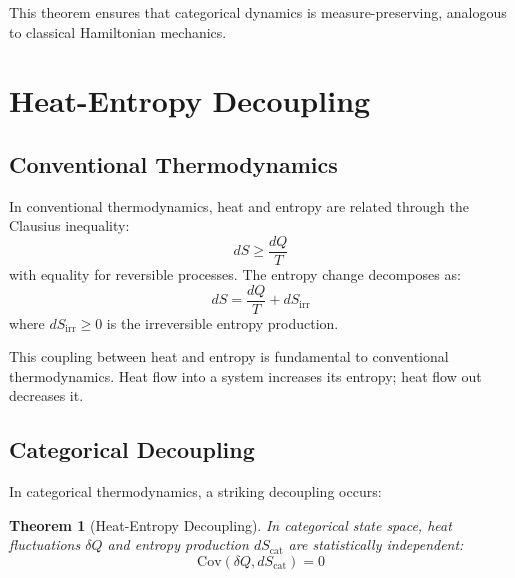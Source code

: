 \documentclass[twocolumn,10pt]{article}
\newtheorem{theorem}{Theorem}[section]
\begin{document}
This theorem ensures that categorical dynamics is measure-preserving, analogous to classical Hamiltonian mechanics.

\section{Heat-Entropy Decoupling}
\label{sec:decoupling}

\subsection{Conventional Thermodynamics}

In conventional thermodynamics, heat and entropy are related through the Clausius inequality:
\begin{equation}
    dS \geq \frac{dQ}{T}
\end{equation}
with equality for reversible processes. The entropy change decomposes as:
\begin{equation}
    dS = \frac{dQ}{T} + dS_{\text{irr}}
\end{equation}
where $dS_{\text{irr}} \geq 0$ is the irreversible entropy production.

This coupling between heat and entropy is fundamental to conventional thermodynamics. Heat flow into a system increases its entropy; heat flow out decreases it.

\subsection{Categorical Decoupling}

In categorical thermodynamics, a striking decoupling occurs:

\begin{theorem}[Heat-Entropy Decoupling]
\label{thm:decoupling}
In categorical state space, heat fluctuations $\delta Q$ and entropy production $dS_{\text{cat}}$ are statistically independent:
\begin{equation}
    \text{Cov}(\delta Q, dS_{\text{cat}}) = 0
\end{equation}
\end{theorem}
\end{document}
